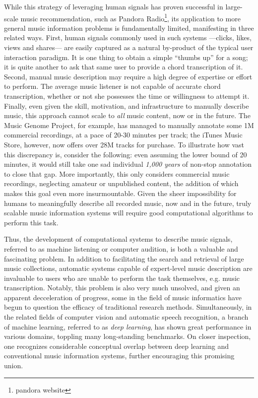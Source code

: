 While this strategy of leveraging human signals has proven successful in large-scale music recommendation, such as Pandora Radio\footnote{pandora website}, its application to more general music information problems is fundamentally limited, manifesting in three related ways.
First, human signals commonly used in such systems ---clicks, likes, views and shares--- are easily captured as a natural by-product of the typical user interaction paradigm.
It is one thing to obtain a simple ``thumbs up'' for a song; it is quite another to ask that same user to provide a chord transcription of it.
Second, manual music description may require a high degree of expertise or effort to perform.
The average music listener is not capable of accurate chord transcription, whether or not she possesses the time or willingness to attempt it.
Finally, even given the skill, motivation, and infrastructure to manually describe music, this approach cannot scale to \emph{all} music content, now or in the future.
The Music Genome Project, for example, has managed to manually annotate some 1M commercial recordings, at a pace of 20-30 minutes per track; the iTunes Music Store, however, now offers over 28M tracks for purchase.
To illustrate how vast this discrepancy is, consider the following: even assuming the lower bound of 20 minutes, it would still take one sad individual \emph{1,000 years} of non-stop annotation to close that gap.
More importantly, this only considers commercial music recordings, neglecting amateur or unpublished content, the addition of which makes this goal even more insurmountable.
Given the sheer impossibility for humans to meaningfully describe all recorded music, now and in the future, truly scalable music information systems will require good computational algorithms to perform this task.

Thus, the development of computational systems to describe music signals, referred to as machine listening or computer audition, is both a valuable and fascinating problem.
In addition to facilitating the search and retrieval of large music collections, automatic systems capable of expert-level music description are invaluable to users who are unable to perform the task themselves, e.g. music transcription.
Notably, this problem is also very much unsolved, and given an apparent decceleration of progress, some in the field of music informatics have begun to question the efficacy of traditional research methods.
Simultaneously, in the related fields of computer vision and automatic speech recognition, a branch of machine learning, referred to as \emph{deep learning}, has shown great performance in various domains, toppling many long-standing benchmarks.
On closer inspection, one recognizes considerable conceptual overlap between deep learning and conventional music information systems, further encouraging this promising union.


